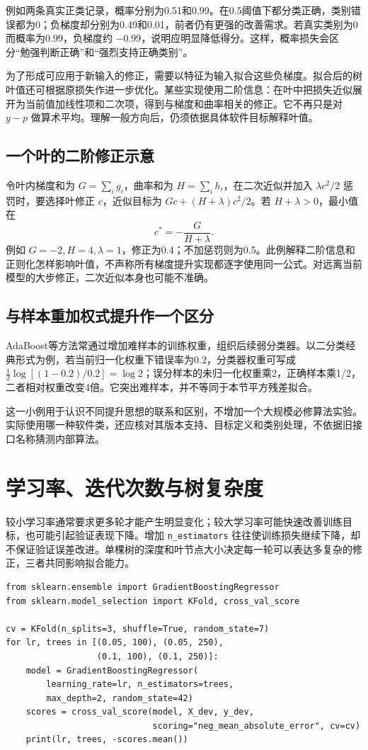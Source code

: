 例如两条真实正类记录，概率分别为0.51和0.99。在0.5阈值下都分类正确，类别错误都为0；负梯度却分别为0.49和0.01，前者仍有更强的改善需求。若真实类别为0而概率为0.99，负梯度约 $-0.99$，说明应明显降低得分。这样，概率损失会区分“勉强判断正确”和“强烈支持正确类别”。

为了形成可应用于新输入的修正，需要以特征为输入拟合这些负梯度。拟合后的树叶值还可根据原损失作进一步优化。某些实现使用二阶信息：在叶中把损失近似展开为当前值加线性项和二次项，得到与梯度和曲率相关的修正。它不再只是对 $y-p$ 做算术平均。理解一般方向后，仍须依据具体软件目标解释叶值。

\subsection{一个叶的二阶修正示意}
令叶内梯度和为 $G=\sum_i g_i$，曲率和为 $H=\sum_i h_i$，在二次近似并加入 $\lambda c^2/2$ 惩罚时，要选择叶修正 $c$，近似目标为 $Gc+(H+\lambda)c^2/2$。若 $H+\lambda>0$，最小值在
\[
c^*=-\frac{G}{H+\lambda}.
\]
例如 $G=-2,H=4,\lambda=1$，修正为0.4；不加惩罚则为0.5。此例解释二阶信息和正则化怎样影响叶值，不声称所有梯度提升实现都逐字使用同一公式。对远离当前模型的大步修正，二次近似本身也可能不准确。

\subsection{与样本重加权式提升作一个区分}
AdaBoost等方法常通过增加难样本的训练权重，组织后续弱分类器。以二分类经典形式为例，若当前归一化权重下错误率为0.2，分类器权重可写成 $\tfrac12\log[(1-0.2)/0.2]=\log2$；误分样本的未归一化权重乘2，正确样本乘1/2，二者相对权重改变4倍。它突出难样本，并不等同于本节平方残差拟合。

这一小例用于认识不同提升思想的联系和区别，不增加一个大规模必修算法实验。实际使用哪一种软件类，还应核对其版本支持、目标定义和类别处理，不依据旧接口名称猜测内部算法。

\section{学习率、迭代次数与树复杂度}
较小学习率通常要求更多轮才能产生明显变化；较大学习率可能快速改善训练目标，也可能引起验证表现下降。增加 \texttt{n\_estimators} 往往使训练损失继续下降，却不保证验证误差改进。单棵树的深度和叶节点大小决定每一轮可以表达多复杂的修正，三者共同影响拟合能力。

\begin{lstlisting}[caption={住房回归：有限规模的提升参数比较}]
from sklearn.ensemble import GradientBoostingRegressor
from sklearn.model_selection import KFold, cross_val_score

cv = KFold(n_splits=3, shuffle=True, random_state=7)
for lr, trees in [(0.05, 100), (0.05, 250),
                  (0.1, 100), (0.1, 250)]:
    model = GradientBoostingRegressor(
        learning_rate=lr, n_estimators=trees,
        max_depth=2, random_state=42)
    scores = cross_val_score(model, X_dev, y_dev,
                             scoring="neg_mean_absolute_error", cv=cv)
    print(lr, trees, -scores.mean())
\end{lstlisting}

